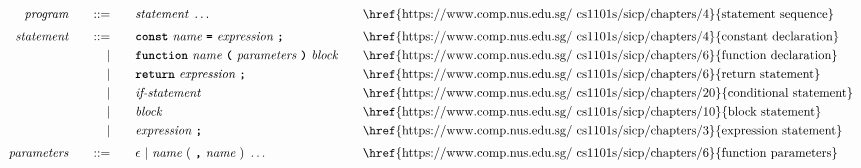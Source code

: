 \begin{alignat*}{9}
&& \textit{program}    &&\quad ::= &\quad && \textit{statement} \ \ldots
                                                           && \textrm{\href{https://www.comp.nus.edu.sg/~cs1101s/sicp/chapters/4}{statement sequence}} \\[1mm]
&& \textit{statement}    &&\quad ::= &\quad && \textbf{\texttt{const}}\  \textit{name} \ 
                                           \textbf{\texttt{=}}\  \textit{expression} \ \textbf{\texttt{;}}
                                                           && \textrm{\href{https://www.comp.nus.edu.sg/~cs1101s/sicp/chapters/4}{constant declaration}} \\
&&                       && |   &\quad && \textbf{\texttt{function}}\  \textit{name} \ 
                                   \textbf{\texttt{(}}\  \textit{parameters} \ \textbf{\texttt{)}}\ \textit{block} \quad
                                                           && \textrm{\href{https://www.comp.nus.edu.sg/~cs1101s/sicp/chapters/6}{function declaration}}\\
&&                       && |   &\quad && \textbf{\texttt{return}}\  \textit{expression} \ \textbf{\texttt{;}}
                                                           && \textrm{\href{https://www.comp.nus.edu.sg/~cs1101s/sicp/chapters/6}{return statement}}\\
&&                       && |   &\quad && \textit{if-statement} \quad
                                                           && \textrm{\href{https://www.comp.nus.edu.sg/~cs1101s/sicp/chapters/20}{conditional statement}}\\
&&                       && |   &\quad &&  \textit{block} 
                                                           && \textrm{\href{https://www.comp.nus.edu.sg/~cs1101s/sicp/chapters/10}{block statement}}\\
&&                       && |   &\quad &&  \textit{expression} \ \textbf{\texttt{;}}
                                                           && \textrm{\href{https://www.comp.nus.edu.sg/~cs1101s/sicp/chapters/3}{expression statement}} \\[1mm]
&& \textit{parameters}   && ::= &\quad &&  \epsilon\ | \  \textit{name} \ 
                                                   (\ \textbf{\texttt{,}} \ \textit{name}\ )\ \ldots
                                                            && \textrm{\href{https://www.comp.nus.edu.sg/~cs1101s/sicp/chapters/6}{function parameters}} \\[1mm]

\end{alignat*}
